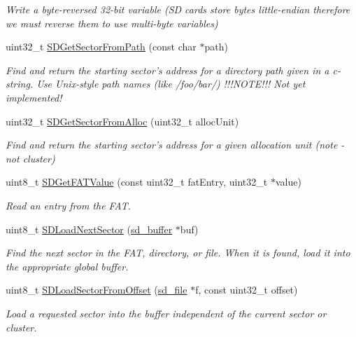 \begin{DoxyCompactItemize}
\begin{DoxyCompactList}\small\item\em \-Write a byte-\/reversed 32-\/bit variable (\-S\-D cards store bytes little-\/endian therefore we must reverse them to use multi-\/byte variables) \end{DoxyCompactList}\item 
uint32\-\_\-t \hyperlink{group__sd__private_ga9b7b559a9ed2c91ca0c9d1f96f5c9a92}{\-S\-D\-Get\-Sector\-From\-Path} (const char $\ast$path)
\begin{DoxyCompactList}\small\item\em \-Find and return the starting sector's address for a directory path given in a c-\/string. \-Use \-Unix-\/style path names (like /foo/bar/) !!!\-N\-O\-T\-E!!! \-Not yet implemented! \end{DoxyCompactList}\item 
uint32\-\_\-t \hyperlink{group__sd__private_gaf3115c47cc913a11540b0abf3b670bce}{\-S\-D\-Get\-Sector\-From\-Alloc} (uint32\-\_\-t alloc\-Unit)
\begin{DoxyCompactList}\small\item\em \-Find and return the starting sector's address for a given allocation unit (note -\/ not cluster) \end{DoxyCompactList}\item 
uint8\-\_\-t \hyperlink{group__sd__private_ga0459bc40447b918a8abf1ebb57a67bb4}{\-S\-D\-Get\-F\-A\-T\-Value} (const uint32\-\_\-t fat\-Entry, uint32\-\_\-t $\ast$value)
\begin{DoxyCompactList}\small\item\em \-Read an entry from the \-F\-A\-T. \end{DoxyCompactList}\item 
uint8\-\_\-t \hyperlink{group__sd__private_ga90dc04d8c4e081ab946e91e6fd06e377}{\-S\-D\-Load\-Next\-Sector} (\hyperlink{struct__sd__buffer}{sd\-\_\-buffer} $\ast$buf)
\begin{DoxyCompactList}\small\item\em \-Find the next sector in the \-F\-A\-T, directory, or file. \-When it is found, load it into the appropriate global buffer. \end{DoxyCompactList}\item 
uint8\-\_\-t \hyperlink{group__sd__private_gafcdb4e5820c4eb65fde1e932aa66e150}{\-S\-D\-Load\-Sector\-From\-Offset} (\hyperlink{struct__sd__file}{sd\-\_\-file} $\ast$f, const uint32\-\_\-t offset)
\begin{DoxyCompactList}\small\item\em \-Load a requested sector into the buffer independent of the current sector or cluster. \end{DoxyCompactList}\item 

\end{DoxyCompactItemize}
